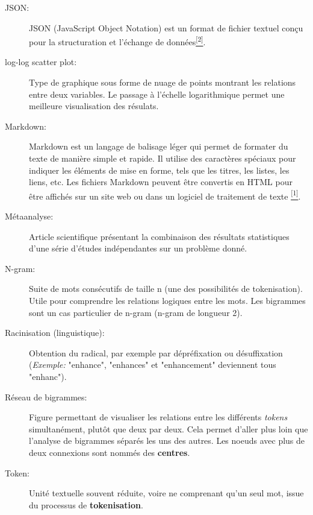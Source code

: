 \documentclass{book}
\begin{document}
\begin{description}

    \item[JSON:] JSON (JavaScript Object Notation) est un format de fichier textuel conçu pour la structuration et l'échange de données\hyperref[site2]{\textsuperscript{[2]}}.
    
    \item[log-log scatter plot:] Type de graphique sous forme de nuage de points montrant les relations entre deux variables. Le passage à l'échelle logarithmique permet une meilleure visualisation des résulats.

    \item[Markdown:] Markdown est un langage de balisage léger qui permet de
        formater du texte de manière simple et rapide. Il utilise des caractères
        spéciaux pour indiquer les éléments de mise en forme, tels que les titres, les
        listes, les liens, etc. Les fichiers Markdown peuvent être convertis en HTML
        pour être affichés sur un site web ou dans un logiciel de traitement de texte
        \hyperref[site1]{\textsuperscript{[1]}}.

    \item[Métaanalyse:] Article scientifique présentant la combinaison des résultats statistiques d'une série d'études indépendantes sur un problème donné. 

    \item[N-gram:] Suite de mots consécutifs de taille n (une des possibilités
        de tokenisation). Utile pour comprendre les relations logiques entre les mots. Les bigrammes sont un cas particulier de n-gram (n-gram de longueur 2).

    \item [Racinisation (linguistique):] Obtention du radical, par exemple par dépréfixation ou \sloppy désuffixation (\textit{Exemple:} "enhance", "enhances" et "enhancement" deviennent tous "enhanc").
    
    \item [Réseau de bigrammes:] Figure permettant de visualiser les relations entre les différents \textit{tokens} simultanément, plutôt que deux par deux. Cela permet d'aller plus loin que l'analyse de bigrammes séparés les uns des autres. Les noeuds avec plus de deux connexions sont nommés des \textbf{centres}.

    \item[Token:] Unité textuelle souvent réduite, voire ne comprenant qu'un
        seul mot, issue du processus de \textbf{tokenisation}.


\end{description}
\end{document}

